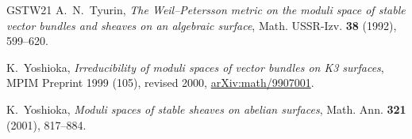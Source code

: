 \begin{thebibliography}{GSTW21}
A.~N.~Tyurin,
\emph{The Weil--Petersson metric on the moduli space of stable vector
bundles and sheaves on an algebraic surface},
Math. USSR-Izv. \textbf{38} (1992), 599--620.

K.~Yoshioka,
\emph{Irreducibility of moduli spaces of vector bundles on K3 surfaces},
MPIM Preprint 1999 (105), revised 2000,
\href{https://arxiv.org/abs/math/9907001}{arXiv:math/9907001}.

K.~Yoshioka,
\emph{Moduli spaces of stable sheaves on abelian surfaces},
Math. Ann. \textbf{321} (2001), 817--884.

\end{thebibliography}
